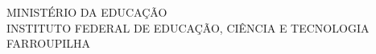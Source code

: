 \begin{Center}
MINISTÉRIO DA EDUCAÇÃO\\
INSTITUTO FEDERAL DE EDUCAÇÃO, CIÊNCIA E TECNOLOGIA\\
FARROUPILHA

\vspace*{\fill}

\autor

\vspace*{\fill}

\textbf{\tituloTrabalho\separadorTrabalho}\subtituloTrabalho

\vspace*{\fill}

\cidadeDefesa

\anoEntrega
\end{Center}